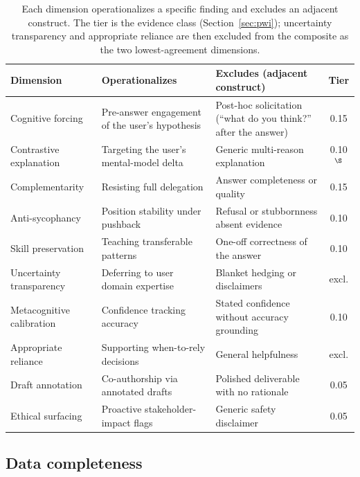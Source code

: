 \documentclass{article}
\begin{document}
\begin{table}[h]
\centering
\caption{Each dimension operationalizes a specific finding and excludes an adjacent construct. The tier is the evidence class (Section~\ref{sec:pwi}); uncertainty transparency and appropriate reliance are then excluded from the composite as the two lowest-agreement dimensions.}
\label{tab:derivation}
\small
\begin{tabular}{lp{3.8cm}p{3.6cm}c}
\toprule
\textbf{Dimension} & \textbf{Operationalizes} & \textbf{Excludes (adjacent construct)} & \textbf{Tier} \\
\midrule
Cognitive forcing & Pre-answer engagement of the user's hypothesis \cite{bucinca2021trust} & Post-hoc solicitation (``what do you think?'' after the answer) & 0.15 \\
Contrastive explanation & Targeting the user's mental-model delta \cite{bucinca2024contrastive} & Generic multi-reason explanation & 0.10$^\S$ \\
Complementarity & Resisting full delegation \cite{vaccaro2024combinations} & Answer completeness or quality & 0.15 \\
Anti-sycophancy & Position stability under pushback \cite{sharma2023sycophancy} & Refusal or stubbornness absent evidence & 0.10 \\
Skill preservation & Teaching transferable patterns \cite{bucinca2024towards,gajos2022people} & One-off correctness of the answer & 0.10 \\
Uncertainty transparency & Deferring to user domain expertise \cite{steyvers2025metacognition} & Blanket hedging or disclaimers & excl. \\
Metacognitive calibration & Confidence tracking accuracy \cite{steyvers2025metacognition} & Stated confidence without accuracy grounding & 0.10 \\
Appropriate reliance & Supporting when-to-rely decisions \cite{schemmer2023appropriate} & General helpfulness & excl. \\
Draft annotation & Co-authorship via annotated drafts \cite{mollick2024cointelligence} & Polished deliverable with no rationale & 0.05 \\
Ethical surfacing & Proactive stakeholder-impact flags \cite{buijsman2025autonomy} & Generic safety disclaimer & 0.05 \\
\bottomrule
\end{tabular}
\end{table}

\subsection{Data completeness}
\label{app:completeness}
\end{document}
